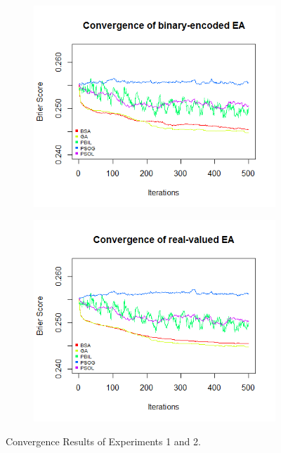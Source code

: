 \begin{figure}
\centering %
	\begin{subfigure}{.5\textwidth}
		\centering
		\includegraphics[width=\linewidth]{Conv_N_bin_EA}
		\label{fig:nb}
	\end{subfigure}%
	\begin{subfigure}{.5\textwidth}
		\centering
		\includegraphics[width=\linewidth]{Conv_N_real_EA}
		\label{fig:nr}
	\end{subfigure}
	\caption{Convergence Results of Experiments 1 and 2.}
	\label{fig:exp12}
\end{figure}

